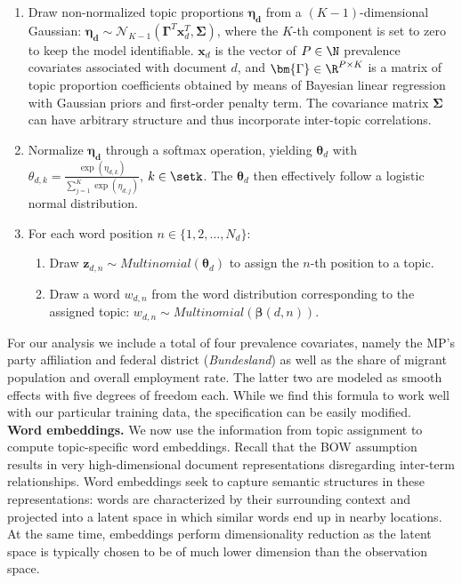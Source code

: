 \begin{enumerate}

  \item Draw non-normalized topic proportions $\bm{\eta_d}$ from a 
  $(K - 1)$-dimensional Gaussian: 
  $\bm{\eta_d} \sim \mathcal{N}_{K - 1}(\bm{\Gamma}^T\bm{x}_d^T, \bm{\Sigma})$, 
  where the $K$-th component is set to zero to keep the model identifiable.
  $\bm{x}_d$ is the vector of $P \in \N$ prevalence covariates associated with 
  document $d$, and $\bm{\Gamma} \in \R^{P \times K}$ is a matrix of topic 
  proportion coefficients obtained by means of Bayesian linear regression with 
  Gaussian priors and first-order penalty term.
  The covariance matrix $\bm{\Sigma}$ can have arbitrary structure and thus 
  incorporate inter-topic correlations.
  
  \item Normalize $\bm{\eta_d}$ through a softmax operation, 
  yielding $\bm{\theta}_d$ with $\theta_{d, k} = \frac{\exp(\eta_{d, k})}{
  \sum_{j = 1}^K \exp(\eta_{d, j})}$, $k \in \setk$. 
  The $\bm{\theta}_d$ then effectively follow a logistic normal distribution. 
  
  \item For each word position $n \in \{ 1, 2, \dots, N_d \}$:
  
  \begin{enumerate}
    \item Draw $\bm{z}_{d, n} \sim \mathit{Multinomial}(\bm{\theta}_d)$ to 
    assign the $n$-th position to a topic. 
    \item Draw a word $w_{d, n}$ from the word distribution corresponding to the 
    assigned topic: $w_{d, n} \sim \mathit{Multinomial}(\bm{\beta}(d, n))$.
  \end{enumerate}
  
\end{enumerate}

For our analysis we include a total of four prevalence covariates, namely the
MP's party affiliation and federal district (\textit{Bundesland}) as well as 
the share of migrant population and overall employment rate.
The latter two are modeled as smooth effects with five degrees of freedom each.
While we find this formula to work well with our particular training data, the 
specification can be easily modified.
\\

\textbf{Word embeddings.}
We now use the information from topic assignment to compute topic-specific word 
embeddings.
Recall that the BOW assumption results in very high-dimensional document 
representations disregarding inter-term relationships.
Word embeddings seek to capture semantic structures in these representations: 
words are characterized by their surrounding context and projected into a latent 
space in which similar words end up in nearby locations.
At the same time, embeddings perform dimensionality reduction as the latent 
space is typically chosen to be of much lower dimension than the 
observation space.

